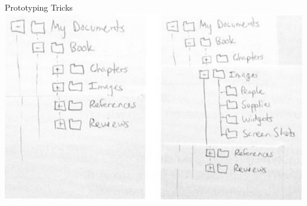 \documentclass[10pt]{beamer}
\begin{document}
\begin{frame}{Prototyping Tricks}
\centering
	\includegraphics[width=\linewidth]{img/expandablelists.png}
\end{frame}

\end{document}
